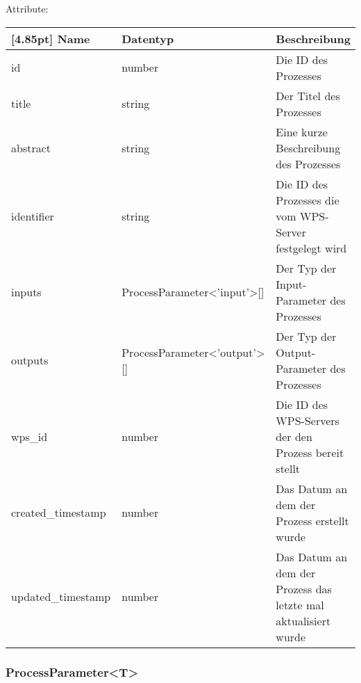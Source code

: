     		Attribute:
            \begin{center}
            	\renewcommand{\arraystretch}{1.5}
                \setlength\tabcolsep{5pt}
            	\begin{tabularx}{\textwidth}{|l|l|X|}
            		\hline
                    \rowcolor[gray]{0.75}[4.85pt]            		
                    Name & Datentyp & Beschreibung \\ \hline
            		id & number & Die ID des Prozesses \\ \hline
            		title & string & Der Titel des Prozesses \\ \hline
            		abstract & string & Eine kurze Beschreibung des Prozesses \\ \hline
            		identifier & string & Die ID des Prozesses die vom WPS-Server festgelegt wird \\ \hline
                    inputs & ProcessParameter<'input'>[] & Der Typ der Input-Parameter des Prozesses \\ \hline
                    outputs & ProcessParameter<'output'>[] & Der Typ der Output-Parameter des Prozesses \\ \hline
            		wps_id & number & Die ID des WPS-Servers der den Prozess bereit stellt \\ \hline
            		created_timestamp & number & Das Datum an dem der Prozess erstellt wurde \\ \hline
            		updated_timestamp & number & Das Datum an dem der Prozess das letzte mal aktualisiert wurde \\ \hline
            	\end{tabularx}
            \end{center}
                
    		\subsubsection{ProcessParameter<T>}
    		
